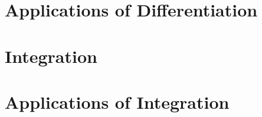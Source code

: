 \documentclass[12pt,a4paper,oneside]{report}
\begin{document}
\chapter{Applications of Differentiation}
\makenewpage
\makenewpage
\makenewpage  
\makenewpage
\makenewpage

\chapter{Integration}
\makenewpage
\makenewpage
\makenewpage
\makenewpage
\makenewpage
\makenewpage

\chapter{Applications of Integration}
\makenewpage
\makenewpage
\makenewpage
\makenewpage

\backmatter
\appendix
\ifincludepastyears
  
\fi


\end{document}
